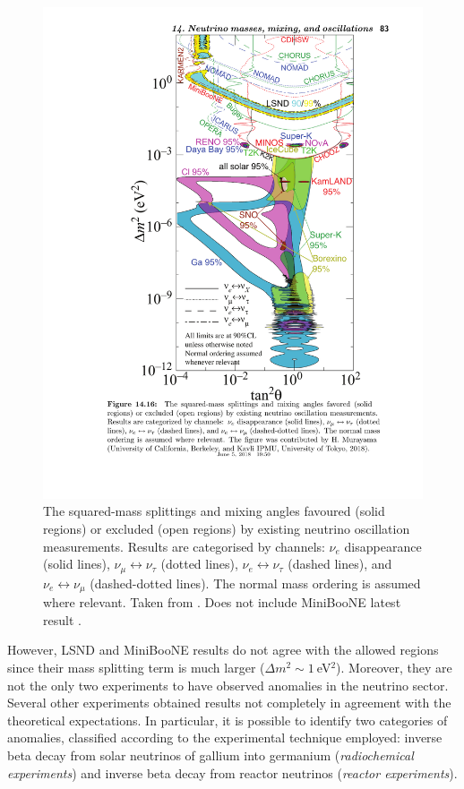 \begin{figure}[htbp]
    \centering
    \includegraphics[width=0.7\linewidth]{figures/globalfit.pdf}
    \caption{The squared-mass splittings and mixing angles favoured (solid regions) or excluded (open regions) by existing neutrino oscillation measurements. Results are categorised by channels: $\nu_e$ disappearance (solid lines), $\nu_{\mu} \leftrightarrow \nu_{\tau}$  (dotted lines), $\nu_{e} \leftrightarrow \nu_{\tau}$ (dashed lines), and $\nu_{e} \leftrightarrow \nu_{\mu}$ (dashed-dotted lines). The normal mass ordering is assumed where relevant. Taken from \cite{PhysRevD.98.030001}. Does not include MiniBooNE latest result \cite{Aguilar-Arevalo:2018gpe}.}
    \label{fig:globalfit}
\end{figure}

However, LSND and MiniBooNE results do not agree with the allowed regions since their mass splitting term is much larger ($\Delta m^2 \sim 1~$eV$^2$). Moreover, they are not the only two experiments to have observed anomalies in the neutrino sector. Several other experiments obtained results not completely in agreement with the theoretical expectations. In particular, it is possible to identify two categories of anomalies, classified according to the experimental technique employed: inverse beta decay from solar neutrinos of gallium into germanium (\emph{radiochemical experiments}) and inverse beta decay from reactor neutrinos (\emph{reactor experiments}).

